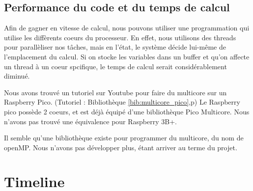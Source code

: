 \documentclass[a4paper]{report}
\begin{document}
            \subsection{Performance du code et du temps de calcul}
            
            Afin de gagner en vitesse de calcul, nous pouvons utiliser une programmation qui utilise
    les diffèrents coeurs du processeur. En effet, nous utilisons des threads pour parallèliser
    nos t\^{a}ches, mais en l'état, le système décide lui-m\^{e}me de l'emplacement du calcul.
    Si on stocke les variables dans un buffer et qu'on affecte un thread à un coeur spcifique, 
    le temps de calcul serait considérablement diminué. 
    
    Nous avons trouvé un tutoriel sur Youtube pour faire du multicore sur un Raspberry Pico.
    (Tutoriel : Bibliothèque \ref{bib:multicore_pico},p\pageref{bib:multicore_pico})
    Le Raspberry pico possède 2 coeurs, et est déjà équipé d'une bibliothèque Pico Multicore.
    Nous n'avons pas trouvé une équivalence pour Raspberry 3B+. 

    Il semble qu'une bibliothèque existe pour programmer du multicore, du nom de openMP. 
    Nous n'avons pas développer plus, étant arriver au terme du projet.
    
        \section{Timeline}
    
\end{document}
